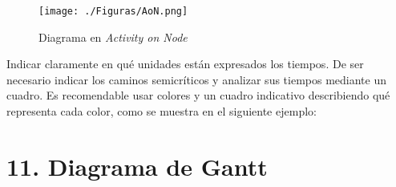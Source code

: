 \documentclass[
11pt, %
codirector, %
]{charter}
\begin{document}
\begin{figure}[htpb]
\centering 
\texttt{[image: ./Figuras/AoN.png]}
\caption{Diagrama en \textit{Activity on Node}}
\label{fig:AoN}
\end{figure}

Indicar claramente en qué unidades están expresados los tiempos.
De ser necesario indicar los caminos semicríticos y analizar sus tiempos mediante un cuadro.
Es recomendable usar colores y un cuadro indicativo describiendo qué representa cada color, como se muestra en el siguiente ejemplo:



\section{11. Diagrama de Gantt}
\label{sec:gantt}
\end{document}
